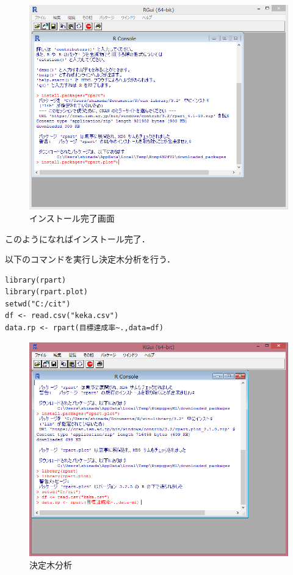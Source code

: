 \newpage

\begin{figure}[H]
\centering
\includegraphics[width=16cm]{R7.PNG}
\caption{インストール完了画面}\label{サンプル図}
\end{figure}
このようになればインストール完了．

\newpage
以下のコマンドを実行し決定木分析を行う．
\begin{verbatim}
library(rpart)
library(rpart.plot)
setwd("C:/cit")
df <- read.csv("keka.csv")
data.rp <- rpart(目標達成率~.,data=df)
\end{verbatim}

\begin{figure}[H]
\centering
\includegraphics[width=16cm]{R8.PNG}
\caption{決定木分析}\label{サンプル図}
\end{figure}


